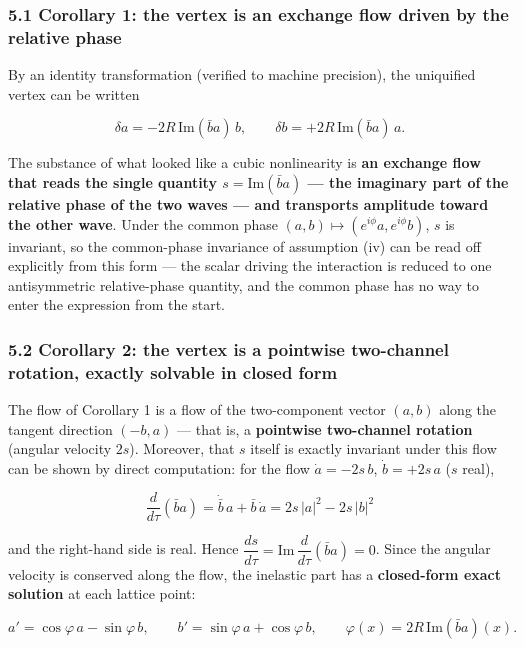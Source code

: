 \documentclass[
  a4paper,
]{article}
\begin{document}
\subsubsection{5.1 Corollary 1: the vertex is an exchange flow driven by
the relative
phase}\label{corollary-1-the-vertex-is-an-exchange-flow-driven-by-the-relative-phase}

By an identity transformation (verified to machine precision), the
uniquified vertex can be written

\[\delta a = -2R\,\mathrm{Im}(\bar b a)\,b, \qquad \delta b = +2R\,\mathrm{Im}(\bar b a)\,a.\]

The substance of what looked like a cubic nonlinearity is \textbf{an
exchange flow that reads the single quantity \(s=\mathrm{Im}(\bar b a)\)
--- the imaginary part of the relative phase of the two waves --- and
transports amplitude toward the other wave}. Under the common phase
\((a,b)\mapsto(e^{i\phi}a, e^{i\phi}b)\), \(s\) is invariant, so the
common-phase invariance of assumption (iv) can be read off explicitly
from this form --- the scalar driving the interaction is reduced to one
antisymmetric relative-phase quantity, and the common phase has no way
to enter the expression from the start.

\subsubsection{5.2 Corollary 2: the vertex is a pointwise two-channel
rotation, exactly solvable in closed
form}\label{corollary-2-the-vertex-is-a-pointwise-two-channel-rotation-exactly-solvable-in-closed-form}

The flow of Corollary 1 is a flow of the two-component vector \((a,b)\)
along the tangent direction \((-b, a)\) --- that is, a \textbf{pointwise
two-channel rotation} (angular velocity \(2s\)). Moreover, that \(s\)
itself is exactly invariant under this flow can be shown by direct
computation: for the flow \(\dot a = -2s\,b\), \(\dot b = +2s\,a\)
(\(s\) real),

\[\frac{d}{d\tau}(\bar b a) = \dot{\bar b}\,a + \bar b\,\dot a = 2s\,|a|^2 - 2s\,|b|^2\]

and the right-hand side is real. Hence
\(\dfrac{ds}{d\tau} = \mathrm{Im}\,\dfrac{d}{d\tau}(\bar b a) = 0\).
Since the angular velocity is conserved along the flow, the inelastic
part has a \textbf{closed-form exact solution} at each lattice point:

\[a' = \cos\varphi\,a - \sin\varphi\,b, \qquad b' = \sin\varphi\,a + \cos\varphi\,b, \qquad \varphi(x) = 2R\,\mathrm{Im}(\bar b a)(x).\]
\end{document}
